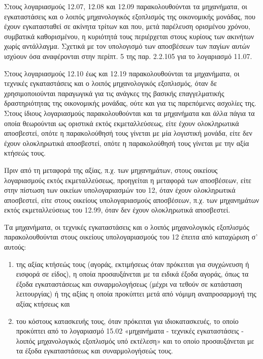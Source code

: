 \documentclass[A4,10pt,greek]{book}
\begin{document}
Στους λογαριασμούς 12.07, 12.08 και 12.09 παρακολουθούνται τα μηχανήματα, οι εγκαταστάσεις και ο λοιπός μηχανολογικός εξοπλισμός της οικονομικής μονάδας, που έχουν εγκατασταθεί σε ακίνητα τρίτων και που, μετά παρέλευση ορισμένου χρόνου, συμβατικά καθορισμένου, η κυριότητά τους περιέρχεται στους κυρίους των ακινήτων χωρίς αντάλλαγμα. Σχετικά με τον υπολογισμό των αποσβέσεων των παγίων αυτών ισχύουν όσα αναφέρονται στην περίπτ. 5 της παρ. 2.2.105 για το λογαριασμό 11.07.

Στους λογαριασμούς 12.10 έως και 12.19 παρακολουθούνται τα μηχανήματα, οι τεχνικές εγκαταστάσεις και ο λοιπός μηχανολογικός εξοπλισμός, όταν δε χρησιμοποιούνται παραγωγικά για τις ανάγκες της βασικής επαγγελματικής δραστηριότητας της οικονομικής μονάδας, ούτε και για τις παρεπόμενες ασχολίες της. Στους ίδιους λογαριασμούς παρακολουθούνται και τα μηχανήματα και άλλα πάγια τα οποία θεωρούνται ως οριστικά εκτός εκμεταλλεύσεως, είτε έχουν ολοκληρωτικά αποσβεστεί, οπότε η παρακολούθησή τους γίνεται με μία λογιστική μονάδα, είτε δεν έχουν ολοκληρωτικά αποσβεστεί, οπότε η παρακολούθησή τους γίνεται με την αξία κτήσεώς τους.

Πριν από τη μεταφορά της αξίας, π.χ. των μηχανημάτων, στους οικείους λογαριασμούς εκτός εκμεταλλεύσεως, προηγείται η μεταφορά των αποσβέσεων, είτε στην πίστωση των οικείων υπολογαριασμών του 12, όταν έχουν ολοκληρωτικά αποσβεστεί, είτε στους οικείους υπολογαριασμούς αποσβέσεων, π.χ. των μηχανημάτων εκτός εκμεταλλεύσεως του 12.99, όταν δεν έχουν ολοκληρωτικά αποσβεστεί.

Τα μηχανήματα, οι τεχνικές εγκαταστάσεις και ο λοιπός μηχανολογικός εξοπλισμός παρακολουθούνται στους οικείους υπολογαριασμούς του 12 έπειτα από καταχώριση σ' αυτούς: 

\begin{enumerate}

\item της αξίας κτήσεώς τους (αγοράς, εκτιμήσεως όταν πρόκειται για συγχώνευση ή εισφορά σε είδος), η οποία προσαυξάνεται με τα ειδικά έξοδα αγοράς, όπως τα έξοδα εγκαταστάσεως και συναρμολογήσεως (μέχρι να τεθούν σε κατάσταση λειτουργίας) ή της αξίας η οποία προκύπτει μετά από νόμιμη αναπροσαρμογή της αξίας κτήσεως και 

\item του κόστους κατασκευής τους, όταν πρόκειται για ιδιοκατασκευές, το οποίο προκύπτει από το λογαριασμό 15.02 «μηχανήματα - τεχνικές εγκαταστάσεις - λοιπός μηχανολογικός εξοπλισμός υπό εκτέλεση» και το οποίο προσαυξάνεται με τα έξοδα εγκαταστάσεως και συναρμολογήσεώς τους.

\end{enumerate}
\end{document}
